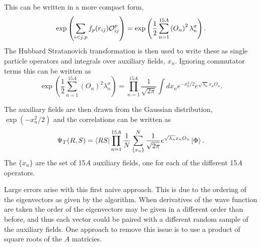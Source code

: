 This can be written in a more compact form,
\begin{equation}
    \exp\left(\sum\limits_{i<j,p}f_p(r_{ij})\mathcal{O}^p_{ij}\right) = \exp\left(\frac{1}{2}\sum\limits_{n=1}^{15A} \left(O_{n}\right)^2 \lambda_n^{\sigma}\right).
\end{equation}
The Hubbard Stratanovich transformation is then used to write these as single particle operators and integrals over auxiliary fields, $x_n$. Ignoring commutator terms this can be written as
\begin{equation}
   \exp\left(\frac{1}{2}\sum\limits_{n=1}^{15A} \left(O_{n}\right)^2 \lambda_n^{\sigma}\right) = \prod\limits_{n=1}^{15A} \frac{1}{\sqrt{2\pi}}\int dx_n e^{-x_n^2/2}e^{\sqrt{\lambda_n}x_nO_n}.
\end{equation}

The auxiliary fields are then drawn from the Gaussian distribution, $\exp\left(-x_n^2/2\right)$ and the correlations can be written as
\begin{equation}
   \Psi_T(R,S) = \left< RS \right|\prod\limits_{n=1}^{15A} \frac{1}{N} \sum\limits_{\{x_n\}}^N\frac{1}{\sqrt{2\pi}}e^{\sqrt{\lambda_n}x_nO_n}\left| \Phi \right>.
\end{equation}
The $\{x_n\}$ are the set of 15$A$ auxiliary fields, one for each of the different 15$A$ operators.

Large errors arise with this first naive approach. This is due to the ordering of the eigenvectors as given by the algorithm. When derivatives of the wave function are taken the order of the eigenvectors may be given in a different order than before, and thus each vector could be paired with a different random sample of the auxiliary fields. One approach to remove this issue is to use a product of square roots of the $A$ matricies.


